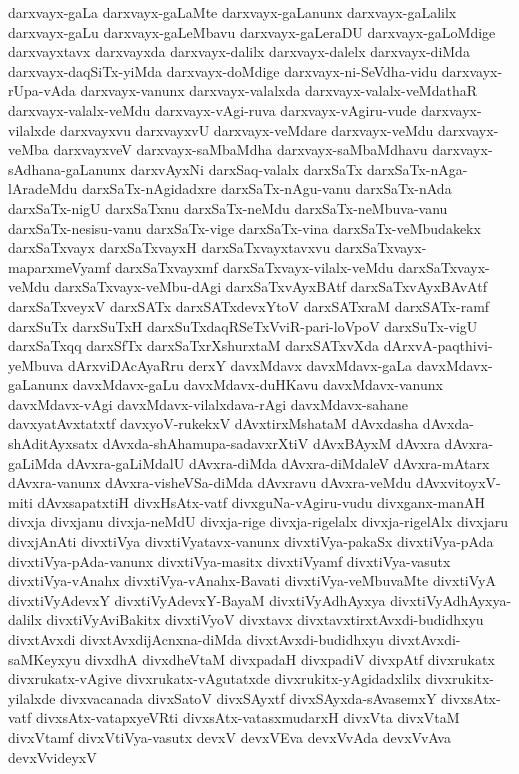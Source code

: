 {darxvayx-gaLa
darxvayx-gaLaMte
darxvayx-gaLanunx
darxvayx-gaLalilx
darxvayx-gaLu
darxvayx-gaLeMbavu
darxvayx-gaLeraDU
darxvayx-gaLoMdige
darxvayxtavx
darxvayxda
darxvayx-dalilx
darxvayx-dalelx
darxvayx-diMda
darxvayx-daqSiTx-yiMda
darxvayx-doMdige
darxvayx-ni-SeVdha-vidu
darxvayx-rUpa-vAda
darxvayx-vanunx
darxvayx-valalxda
darxvayx-valalx-veMdathaR
darxvayx-valalx-veMdu
darxvayx-vAgi-ruva
darxvayx-vAgiru-vude
darxvayx-vilalxde
darxvayxvu
darxvayxvU
darxvayx-veMdare
darxvayx-veMdu
darxvayx-veMba
darxvayxveV
darxvayx-saMbaMdha
darxvayx-saMbaMdhavu
darxvayx-sAdhana-gaLanunx
darxvAyxNi
darxSaq-valalx
darxSaTx
darxSaTx-nAga-lAradeMdu
darxSaTx-nAgidadxre
darxSaTx-nAgu-vanu
darxSaTx-nAda
darxSaTx-nigU
darxSaTxnu
darxSaTx-neMdu
darxSaTx-neMbuva-vanu
darxSaTx-nesisu-vanu
darxSaTx-vige
darxSaTx-vina
darxSaTx-veMbudakekx
darxSaTxvayx
darxSaTxvayxH
darxSaTxvayxtavxvu
darxSaTxvayx-maparxmeVyamf
darxSaTxvayxmf
darxSaTxvayx-vilalx-veMdu
darxSaTxvayx-veMdu
darxSaTxvayx-veMbu-dAgi
darxSaTxvAyxBAtf
darxSaTxvAyxBAvAtf
darxSaTxveyxV
darxSATx
darxSATxdevxYtoV
darxSATxraM
darxSATx-ramf
darxSuTx
darxSuTxH
darxSuTxdaqRSeTxVviR-pari-loVpoV
darxSuTx-vigU
darxSaTxqq
darxSfTx
darxSaTxrXshurxtaM
darxSATxvXda
dArxvA-paqthivi-yeMbuva
dArxviDAcAyaRru
derxY
davxMdavx
davxMdavx-gaLa
davxMdavx-gaLanunx
davxMdavx-gaLu
davxMdavx-duHKavu
davxMdavx-vanunx
davxMdavx-vAgi
davxMdavx-vilalxdava-rAgi
davxMdavx-sahane
davxyatAvxtatxtf
davxyoV-rukekxV
dAvxtirxMshataM
dAvxdasha
dAvxda-shAditAyxsatx
dAvxda-shAhamupa-sadavxrXtiV
dAvxBAyxM
dAvxra
dAvxra-gaLiMda
dAvxra-gaLiMdalU
dAvxra-diMda
dAvxra-diMdaleV
dAvxra-mAtarx
dAvxra-vanunx
dAvxra-visheVSa-diMda
dAvxravu
dAvxra-veMdu
dAvxvitoyxV-miti
dAvxsapatxtiH
divxHsAtx-vatf
divxguNa-vAgiru-vudu
divxganx-manAH
divxja
divxjanu
divxja-neMdU
divxja-rige
divxja-rigelalx
divxja-rigelAlx
divxjaru
divxjAnAti
divxtiVya
divxtiVyatavx-vanunx
divxtiVya-pakaSx
divxtiVya-pAda
divxtiVya-pAda-vanunx
divxtiVya-masitx
divxtiVyamf
divxtiVya-vasutx
divxtiVya-vAnahx
divxtiVya-vAnahx-Bavati
divxtiVya-veMbuvaMte
divxtiVyA
divxtiVyAdevxY
divxtiVyAdevxY-BayaM
divxtiVyAdhAyxya
divxtiVyAdhAyxya-dalilx
divxtiVyAviBakitx
divxtiVyoV
divxtavx
divxtavxtirxtAvxdi-budidhxyu
divxtAvxdi
divxtAvxdijAcnxna-diMda
divxtAvxdi-budidhxyu
divxtAvxdi-saMKeyxyu
divxdhA
divxdheVtaM
divxpadaH
divxpadiV
divxpAtf
divxrukatx
divxrukatx-vAgive
divxrukatx-vAgutatxde
divxrukitx-yAgidadxlilx
divxrukitx-yilalxde
divxvacanada
divxSatoV
divxSAyxtf
divxSAyxda-sAvasemxY
divxsAtx-vatf
divxsAtx-vatapxyeVRti
divxsAtx-vatasxmudarxH
divxVta
divxVtaM
divxVtamf
divxVtiVya-vasutx
devxV
devxVEva
devxVvAda
devxVvAva
devxVvideyxV
}
